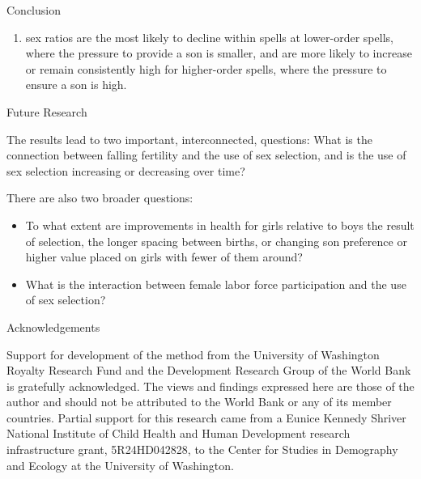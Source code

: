 \documentclass[final]{beamer}
\newlength{\onecolwid}
\begin{document}
\begin{frame}{}
\begin{columns}[t]
\begin{column}{\onecolwid}
\begin{alertblock}{Conclusion}
\begin{enumerate}
\item sex ratios are the most likely to decline within spells at
lower-order spells, where the pressure to provide a son is smaller, and
are more likely to increase or remain consistently high for higher-order
spells, where the pressure to ensure a son is high.

\end{enumerate}

\end{alertblock}

\begin{block}{Future Research}

The results lead to two important, interconnected, questions:
What is the connection between falling fertility and the 
use of sex selection, and is the use of sex selection increasing 
or decreasing over time?

\bigskip

There are also two broader questions:
\begin{itemize}
\item To what extent are improvements in health for girls
relative to boys the result of selection, the longer spacing between
births, or changing son preference or higher value placed on girls
with fewer of them around?
\item What is the interaction between female labor force participation
and the use of sex selection?
\end{itemize}

\end{block}

\begin{block}{Acknowledgements}

Support for development of the method from the University of Washington Royalty 
Research Fund and the Development Research Group of the World Bank is gratefully 
acknowledged.
The views and findings expressed here are those of the author and
should not be attributed to the World Bank or any of its member countries.
Partial support for this research came from a Eunice Kennedy Shriver National
Institute of Child Health and Human Development research infrastructure grant,
5R24HD042828, to the Center for Studies in Demography and Ecology at the
University of Washington.

\end{block}



\end{column}


\end{columns}

\end{frame}
\end{document}
